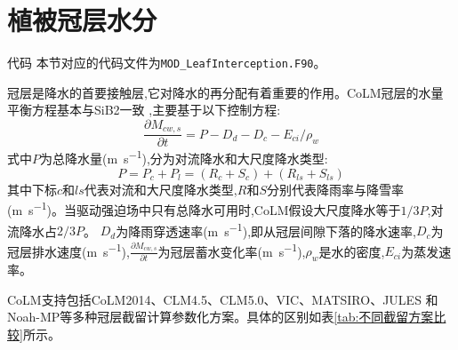 
\chapter{植被冠层水分}\label{植被冠层截留}

\begin{mymdframed}{代码}
本节对应的代码文件为\texttt{MOD\_LeafInterception.F90}。
\end{mymdframed}

冠层是降水的首要接触层,它对降水的再分配有着重要的作用。CoLM冠层的水量平衡方程基本与SiB2一致 \citep{sellers1996revised},主要基于以下控制方程:
\begin{equation}\label{eq:冠层水量控制方程}
\frac{\partial M_{cw,s}}{\partial t} = P-D_{d}-D_{c}-E_{ci} / \rho_{w}
\end{equation}
式中$P$为总降水量(\unit{m s^{-1}}),分为对流降水和大尺度降水类型:
\begin{equation}\label{eq:降水类型}
P=P_{c}+P_{l}=\left(R_{c}+S_{c}\right)+\left(R_{ls}+S_{ls}\right)
\end{equation}
其中下标$c$和$ls$代表对流和大尺度降水类型,$R$和$S$分别代表降雨率与降雪率(\unit{m s^{-1}})。当驱动强迫场中只有总降水可用时,CoLM假设大尺度降水等于$1/3P$,对流降水占$2/3P$。
$D_d$为降雨穿透速率(\unit{m s^{-1}}),即从冠层间隙下落的降水速率,$D_c$为冠层排水速度(\unit{m s^{-1}}),$\frac{\partial M_{cw,s}}{\partial t}$为冠层蓄水变化率(\unit{m s^{-1}}),$\rho_w$是水的密度,$E_{ci}$为蒸发速率。

CoLM支持包括CoLM2014、CLM4.5、CLM5.0、VIC、MATSIRO、JULES 和Noah-MP等多种冠层截留计算参数化方案。具体的区别如表\ref{tab:不同截留方案比较}所示。

